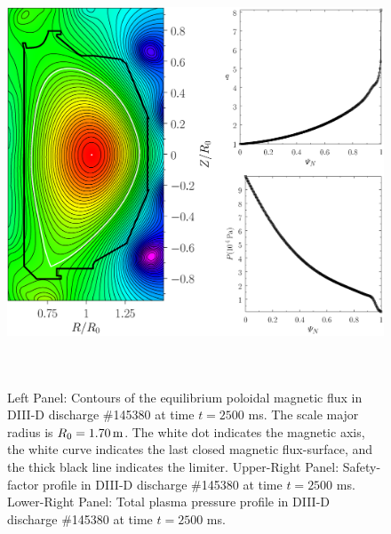 \documentclass[12pt,prb,aps]{revtex4-1}
\begin{document}
\begin{figure}
\includegraphics[height=5in]{fig2.pdf}
\caption{Left Panel: Contours of the equilibrium poloidal
magnetic flux in   DIII-D discharge \#145380 at time $t=2500$ ms. The scale major radius is $R_0=1.70\,{\rm m}$. The white dot indicates the magnetic axis, the white curve indicates the
last closed magnetic flux-surface, and the thick black line indicates the limiter. 
Upper-Right Panel: Safety-factor profile in DIII-D discharge \#145380 at time $t=2500$ ms. Lower-Right Panel:  Total plasma pressure profile in DIII-D discharge \#145380 at time $t=2500$ ms. } \label{fig2}
\end{figure}
\end{document}
